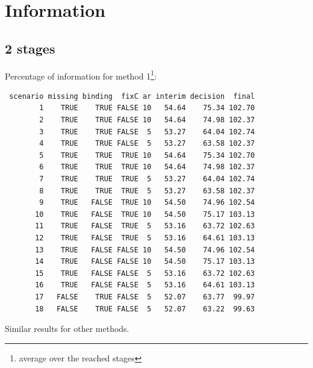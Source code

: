 \documentclass[12pt]{article}
\begin{document}
\clearpage

\section{Information}
\label{sec:orgfa3cd48}

\subsection{2 stages}
\label{sec:org9e27476}
Percentage of information for method 1\footnote{average over the reached stages}:
\begin{verbatim}
 scenario missing binding  fixC ar interim decision  final
        1    TRUE    TRUE FALSE 10   54.64    75.34 102.70
        2    TRUE    TRUE FALSE 10   54.64    74.98 102.37
        3    TRUE    TRUE FALSE  5   53.27    64.04 102.74
        4    TRUE    TRUE FALSE  5   53.27    63.58 102.37
        5    TRUE    TRUE  TRUE 10   54.64    75.34 102.70
        6    TRUE    TRUE  TRUE 10   54.64    74.98 102.37
        7    TRUE    TRUE  TRUE  5   53.27    64.04 102.74
        8    TRUE    TRUE  TRUE  5   53.27    63.58 102.37
        9    TRUE   FALSE  TRUE 10   54.50    74.96 102.54
       10    TRUE   FALSE  TRUE 10   54.50    75.17 103.13
       11    TRUE   FALSE  TRUE  5   53.16    63.72 102.63
       12    TRUE   FALSE  TRUE  5   53.16    64.61 103.13
       13    TRUE   FALSE FALSE 10   54.50    74.96 102.54
       14    TRUE   FALSE FALSE 10   54.50    75.17 103.13
       15    TRUE   FALSE FALSE  5   53.16    63.72 102.63
       16    TRUE   FALSE FALSE  5   53.16    64.61 103.13
       17   FALSE    TRUE FALSE  5   52.07    63.77  99.97
       18   FALSE    TRUE FALSE  5   52.07    63.22  99.63
\end{verbatim}

Similar results for other methods.
\end{document}
